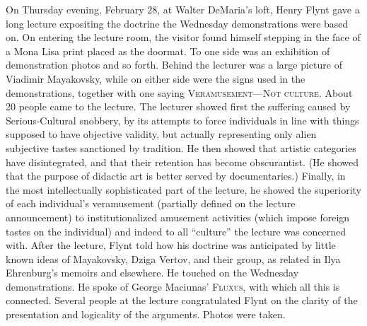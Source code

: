 On Thursday evening, February 28, at Walter DeMaria's loft, Henry Flynt gave a long lecture expositing the doctrine the Wednesday demonstrations were based on. On entering the lecture room, the visitor found himself stepping in the face of a Mona Lisa print placed as the doormat. To one side was an exhibition of demonstration photos and so forth. Behind the lecturer was a large picture of Viadimir Mayakovsky, while on either side were the signs used in the demonstrations, together with one saying \textsc{Veramusement---Not culture}. About 20 people came to the lecture. The lecturer showed first the suffering caused by Serious-Cultural snobbery, by its attempts to force individuals in line with things supposed to have objective validity, but actually representing only alien subjective tastes sanctioned by tradition. He then showed that artistic categories have disintegrated, and that their retention has become obscurantist. (He showed that the purpose of didactic art is better served by documentaries.) Finally, in the most intellectually sophisticated part of the lecture, he showed the superiority of each individual's veramusement (partially defined on the lecture announcement) to institutionalized amusement activities (which impose foreign tastes on the individual) and indeed to all \enquote{culture} the lecture was concerned with. After the lecture, Flynt told how his doctrine was anticipated by little known ideas of Mayakovsky, Dziga Vertov, and their group, as related in Ilya Ehrenburg's memoirs and elsewhere. He touched on the Wednesday demonstrations. He spoke of George Maciunas' \textsc{Fluxus}, with which all this is connected. Several people at the lecture congratulated Flynt on the clarity of the presentation and logicality of the arguments. Photos were taken. 

